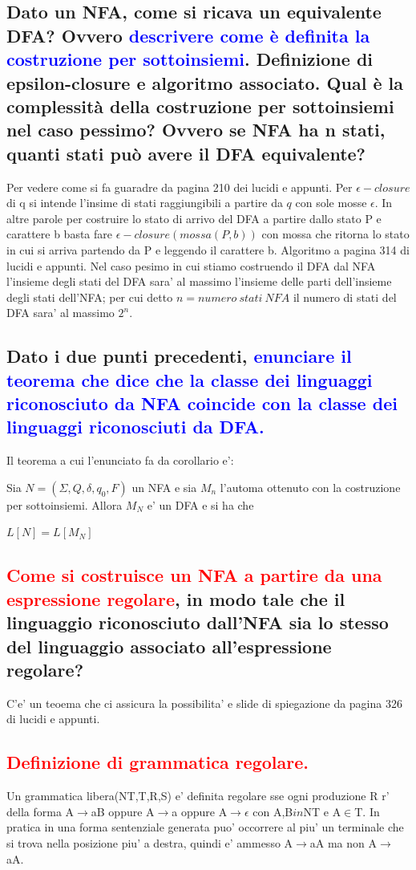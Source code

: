 \documentclass{article}
\begin{document}
\subsection{Dato un NFA, come si ricava un equivalente DFA? Ovvero \textcolor{blue}{descrivere come è definita la costruzione per sottoinsiemi}.
    Definizione di epsilon-closure e algoritmo associato. Qual è la complessità della costruzione per sottoinsiemi nel caso pessimo?
    Ovvero se NFA ha n stati, quanti stati può avere il DFA equivalente?}
Per vedere come si fa guaradre da pagina 210 dei lucidi e appunti.
Per $\epsilon-closure$ di q si intende l'insime di stati raggiungibili a partire da $q$ con sole mosse $\epsilon$. In altre parole per costruire lo stato di arrivo del DFA a partire dallo stato P e carattere
b basta fare $\epsilon-closure(mossa(P,b))$ con mossa che ritorna lo stato in cui si arriva partendo da P e leggendo il carattere b.
Algoritmo a pagina 314 di lucidi e appunti.
Nel caso pesimo in cui stiamo costruendo il DFA dal NFA l'insieme degli stati del DFA sara' al massimo l'insieme delle parti dell'insieme degli stati dell'NFA; per cui detto $n=numero\ stati\ NFA$ il numero di stati del DFA sara' al massimo $2^n$.
\subsection{Dato i due punti precedenti, \textcolor{blue}{enunciare il teorema che dice che la classe dei linguaggi riconosciuto da NFA coincide con la classe dei linguaggi riconosciuti da DFA.}}
Il teorema a cui l'enunciato fa da corollario e':

Sia $N=(\Sigma,Q,\delta,q_0,F)$ un NFA e sia $M_n$ l'automa ottenuto con la
costruzione per sottoinsiemi. Allora $M_N$ e' un DFA e si ha che \newline \begin{center} $L[N] = L[M_N]$
\end{center}
\subsection{\textcolor{red}{Come si costruisce un NFA a partire da una espressione regolare}, in modo tale che il linguaggio riconosciuto dall'NFA sia lo stesso
    del linguaggio associato all'espressione regolare?}
C'e' un teoema che ci assicura la possibilita' e slide di spiegazione da pagina 326 di lucidi e appunti.
\subsection{\textcolor{red}{Definizione di grammatica regolare.}}
Un grammatica libera(NT,T,R,S) e' definita regolare sse ogni produzione R r' della forma A$\to$aB oppure A$\to$a oppure A$\to\epsilon$ con A,B$in$NT e A$\in$T.
In pratica in una forma sentenziale generata puo' occorrere al piu' un terminale che si trova nella posizione piu' a destra, quindi e' ammesso A$\to$aA ma non A$\to$aA.
\end{document}
